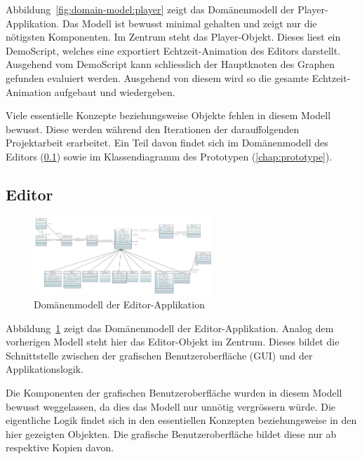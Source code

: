 Abbildung~\ref{fig:domain-model:player} zeigt das Domänenmodell der
Player-Applikation. Das Modell ist bewusst minimal gehalten und zeigt nur die
nötigsten Komponenten. Im Zentrum steht das Player-Objekt. Dieses liest ein
DemoScript, welches eine exportiert Echtzeit-Animation des Editors darstellt.
Ausgehend vom DemoScript kann schliesslich der Hauptknoten des Graphen gefunden
evaluiert werden. Ausgehend von diesem wird so die gesamte Echtzeit-Animation
aufgebaut und wiedergeben.

Viele essentielle Konzepte beziehungsweise Objekte fehlen in diesem Modell
bewusst. Diese werden während den Iterationen der darauffolgenden Projektarbeit
erarbeitet. Ein Teil davon findet sich im Domänenmodell des Editors
(\ref{subsec:domain-model:editor}) sowie im Klassendiagramm des Prototypen
(\ref{chap:prototype}).

\subsection{Editor}
\label{subsec:domain-model:editor}

\begin{figure}[H]
    \centering
    \includegraphics[angle=90,width=0.6\textwidth]{img/editor_domain_model.png}
    \caption{Domänenmodell der
        Editor-Applikation\protect\footnotemark}\label{fig:domain-model:editor}
\end{figure}

Abbildung~\ref{fig:domain-model:editor} zeigt das Domänenmodell der
Editor-Applikation. Analog dem vorherigen Modell steht hier das Editor-Objekt
im Zentrum. Dieses bildet die Schnittstelle zwischen der grafischen
Benutzeroberfläche (GUI) und der Applikationslogik.

Die Komponenten der grafischen Benutzeroberfläche wurden in diesem Modell
bewusst weggelassen, da dies das Modell nur unnötig vergrössern würde. Die
eigentliche Logik findet sich in den essentiellen Konzepten beziehungsweise in
den hier gezeigten Objekten. Die grafische Benutzeroberfläche bildet diese nur
ab respektive Kopien davon.

